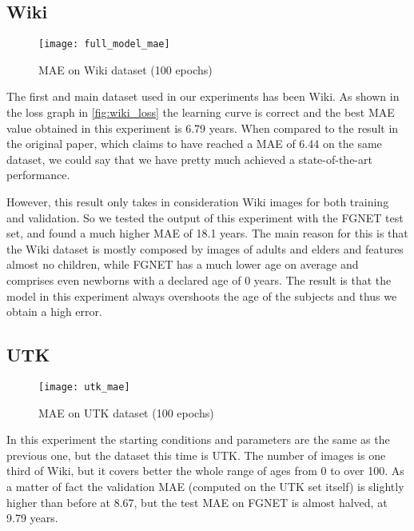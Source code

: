\newpage

\subsection{Wiki}
\label{subsec:wiki}

\begin{wrapfigure}[15]{r}{0.5\textwidth}
  \centering
  \vspace{-20pt}
  \texttt{[image: full\_model\_mae]}
  \caption{MAE on Wiki dataset (100 epochs)}
  \label{fig:wiki_loss}
\end{wrapfigure}

The first and main dataset used in our experiments has been Wiki.
As shown in the loss graph in \autoref{fig:wiki_loss} the learning curve is
correct and the best MAE value obtained in this experiment is 6.79 years. 
When compared to the result in the original paper, which claims to have reached 
a MAE of 6.44 on the same dataset, we could say that we have pretty much achieved
a state-of-the-art performance.

However, this result only takes in consideration Wiki images for both training
and validation. So we tested the output of this experiment with the FGNET test set,
and found a much higher MAE of 18.1 years.
The main reason for this is that the Wiki dataset is mostly composed by images
of adults and elders and features almost no children, while FGNET has a much lower
age on average and comprises even newborns with a declared age of 0 years. 
The result is that the model in this experiment always overshoots the age of the 
subjects and thus we obtain a high error.

\subsection{UTK}
\label{subsec:utk}

\begin{wrapfigure}[12]{r}{0.5\textwidth}
  \centering
  \vspace{-20pt}
  \texttt{[image: utk\_mae]}
  \caption{MAE on UTK dataset (100 epochs)}
  \label{fig:utk_loss}
\end{wrapfigure}

In this experiment the starting conditions and parameters are the same as the 
previous one, but the dataset this time is UTK. The number of images is one third
of Wiki, but it covers better the whole range of ages from 0 to over 100.
As a matter of fact the validation MAE (computed on the UTK set itself) is slightly
higher than before at 8.67, but the test MAE on FGNET is almost halved, at 9.79 years.

